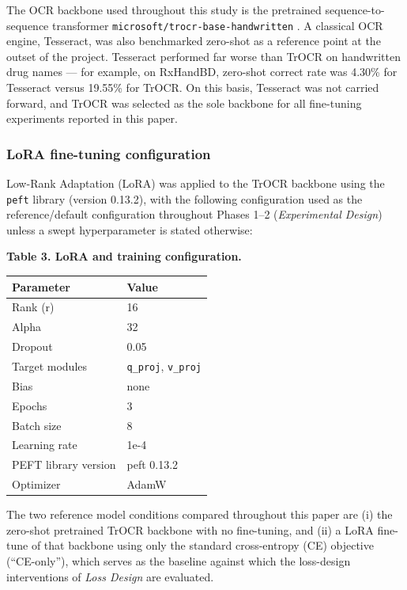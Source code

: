 \documentclass[fleqn,10pt]{wlpeerj}
\begin{document}
The OCR backbone used throughout this study is the pretrained sequence-to-sequence transformer \texttt{microsoft/\allowbreak trocr-base-handwritten} \citep{li2023trocr}. A classical OCR engine, Tesseract, was also benchmarked zero-shot as a reference point at the outset of the project. Tesseract performed far worse than TrOCR on handwritten drug names --- for example, on RxHandBD, zero-shot correct rate was 4.30\% for Tesseract versus 19.55\% for TrOCR. On this basis, Tesseract was not carried forward, and TrOCR was selected as the sole backbone for all fine-tuning experiments reported in this paper.

\subsubsection*{LoRA fine-tuning configuration}\label{sec:lora-config}

Low-Rank Adaptation (LoRA) \citep{hu2022lora} was applied to the TrOCR backbone using the \texttt{peft} library (version 0.13.2), with the following configuration used as the reference/default configuration throughout Phases 1--2 (\textit{Experimental Design}) unless a swept hyperparameter is stated otherwise:

\textbf{Table 3. LoRA and training configuration.}

\begin{longtable}[]{@{}ll@{}}
\toprule\noalign{}
Parameter & Value \\
\midrule\noalign{}
\endhead
\bottomrule\noalign{}
\endlastfoot
Rank (r) & 16 \\
Alpha & 32 \\
Dropout & 0.05 \\
Target modules & \texttt{q\_proj}, \texttt{v\_proj} \\
Bias & none \\
Epochs & 3 \\
Batch size & 8 \\
Learning rate & 1e-4 \\
PEFT library version & peft 0.13.2 \\
Optimizer & AdamW \\
\end{longtable}

The two reference model conditions compared throughout this paper are (i) the zero-shot pretrained TrOCR backbone with no fine-tuning, and (ii) a LoRA fine-tune of that backbone using only the standard cross-entropy (CE) objective (``CE-only''), which serves as the baseline against which the loss-design interventions of \textit{Loss Design} are evaluated.
\end{document}
